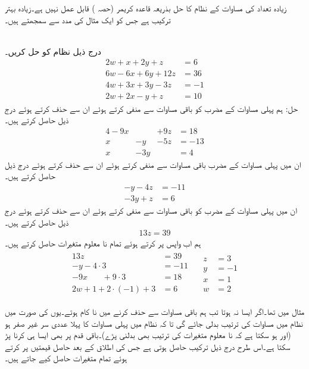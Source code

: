 زیادہ تعداد کی مساوات کے نظام کا حل بذریعہ قاعدہ کریمر (حصہ )  قابل عمل نہیں ہے۔زیادہ بہتر ترکیب  ہے جس کو ایک مثال کی مدد سے سمجھتے ہیں۔

\quad {}\\
درج ذیل نظام کو حل کریں۔
\begin{align*}
2w+x+2y+z&=6\\
6w-6x+6y+12z&=36\\
4w+3x+3y-3z&=-1\\
2w+2x-y+z&=10
\end{align*}
حل:\quad
{} ہم پہلی مساوات کے  مضرب  کو باقی مساوات سے منفی کرتے ہوئے ان سے  حذف کرتے ہوئے درج ذیل حاصل کرتے ہیں۔
\begin{alignat*}{4}
-9x&{}&+9z&=18\\
x&-y&-5z&=-13\\
x&-3y&{}&=4
\end{alignat*}
 ان میں پہلی مساوات کے مضرب باقی مساوات سے منفی کرتے ہوئے ان سے  حذف کرتے ہوئے درج ذیل حاصل کرتے ہیں۔
\begin{align*}
-y-4z&=-11\\
-3y+z&=6
\end{align*}
 ان میں پہلی مساوات کے مضرب کو باقی مساوات سے منفی کرتے ہوئے ان سے  حذف کرتے ہوئے درج ذیل حاصل کرتے ہیں۔
\begin{align*}
13z=39
\end{align*}
 ہم اب واپس پر کرتے ہوئے تمام نا معلوم متغیرات حاصل کرتے ہیں۔
\begin{gather}
\begin{aligned}
13z&=39\\
-y-4\cdot3&=-11\\
-9x\phantom{+4y}+9\cdot 3&=18\\
2w+1+2\cdot(-1)+3&=6
\end{aligned}
\quad 
\begin{aligned}
z&=3\\
y&=-1\\
x&=1\\
w&=2
\end{aligned}
\end{gather} 

مثال  میں  تھا۔اگر ایسا نہ ہوتا تب ہم باقی مساوات سے  حذف کرنے میں نا کام ہوتے۔یوں  کی صورت میں نظام میں مساوات کی ترتیب بدلی جائے گی  تا کہ نظام میں پہلی مساوات کا پہلا عددی سر غیر صفر ہو (اور ہو سکتا ہے کہ نا معلوم متغیرات کی ترتیب بھی بدلنی پڑے)۔باقی قدم پر بھی ایسا ہی کرنا پڑ سکتا ہے۔اس طرح درج ذیل ترکیب حاصل ہوتی ہے جس کی اطلاق کے بعد حاصل قیمتیں پر کرتے ہوئے تمام متغیرات حاصل کیے جاتے ہیں۔


